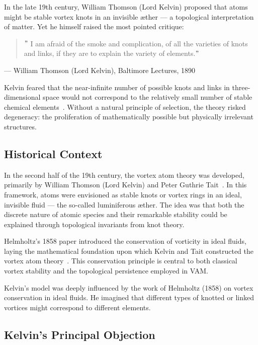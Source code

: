    In the late 19th century, William Thomson (Lord Kelvin) proposed that atoms might be stable vortex knots in an invisible æther — a topological interpretation of matter. Yet he himself raised the most pointed critique:

   \begin{quote}
   \("\) I am afraid of the smoke and complication, of all the varieties of knots and links, if they are to explain the variety of elements.\("\)
   \end{quote}
   \begin{flushright}
     — William Thomson (Lord Kelvin), Baltimore Lectures, 1890
   \end{flushright}

   Kelvin feared that the near-infinite number of possible knots and links in three-dimensional space would not correspond to the relatively small number of stable chemical elements~\cite{thomson1890knots, tait1877knots}. Without a natural principle of selection, the theory risked degeneracy: the proliferation of mathematically possible but physically irrelevant structures.

   \subsection*{Historical Context}

   In the second half of the 19th century, the vortex atom theory was developed, primarily by William Thomson (Lord Kelvin) and Peter Guthrie Tait~\cite{thomson1890knots, tait1877knots}. In this framework, atoms were envisioned as stable knots or vortex rings in an ideal, invisible fluid — the so-called luminiferous æther. The idea was that both the discrete nature of atomic species and their remarkable stability could be explained through topological invariants from knot theory.

   Helmholtz's 1858 paper introduced the conservation of vorticity in ideal fluids, laying the mathematical foundation upon which Kelvin and Tait constructed the vortex atom theory~\cite{helmholtz1858vortices}. This conservation principle is central to both classical vortex stability and the topological persistence employed in VAM.

   Kelvin's model was deeply influenced by the work of Helmholtz (1858) on vortex conservation in ideal fluids. He imagined that different types of knotted or linked vortices might correspond to different elements.

   \subsection*{Kelvin's Principal Objection}

